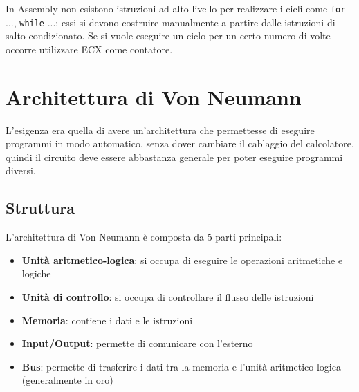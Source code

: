 \documentclass[a4paper]{article}
\theoremstyle{break}
\theoremstyle{break}
\theoremstyle{break}
\theoremstyle{break}
\begin{document}
\noindent In Assembly non esistono istruzioni ad alto livello per realizzare i cicli come \texttt{for} ...,
\texttt{while} ...; essi si devono costruire manualmente a partire dalle istruzioni di salto
condizionato. Se si vuole eseguire un ciclo per un certo numero di volte occorre utilizzare
ECX come contatore.

\section{Architettura di Von Neumann}
L'esigenza era quella di avere un'architettura che permettesse di eseguire programmi
in modo automatico, senza dover cambiare il cablaggio del calcolatore, quindi il circuito
deve essere abbastanza generale per poter eseguire programmi diversi.

\subsection{Struttura}
L'architettura di Von Neumann è composta da 5 parti principali:
\begin{itemize}
	\item \textbf{Unità aritmetico-logica}: si occupa di eseguire le operazioni aritmetiche e logiche
	\item \textbf{Unità di controllo}: si occupa di controllare il flusso delle istruzioni
	\item \textbf{Memoria}: contiene i dati e le istruzioni
	\item \textbf{Input/Output}: permette di comunicare con l'esterno
	\item \textbf{Bus}: permette di trasferire i dati tra la memoria e l'unità aritmetico-logica (generalmente in oro)
\end{itemize}

\begin{figure}[H]
	\centering
\end{figure}
\end{document}
